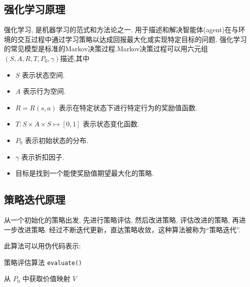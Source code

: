 \subsection{强化学习原理}

强化学习, 是机器学习的范式和方法论之一. 
用于描述和解决智能体(agent)在与环境的交互过程中通过学习策略以达成回报最大化或实现特定目标的问题.
强化学习的常见模型是标准的Markov决策过程.Markov决策过程可以用六元组\((S,A,R,T,P_0,\gamma)\)描述,其中
\begin{itemize}
    \item \(S\) 表示状态空间.
    \item \(A\) 表示行为空间.
    \item \(R = R(s, a)\) 表示在特定状态下进行特定行为的奖励值函数.
    \item \(T: S \times A \times S \mapsto [0,1]\) 表示状态变化函数.
    \item \(P_0\) 表示初始状态的分布.
    \item \(\gamma\) 表示折扣因子.
    \item 目标是找到一个能使奖励值期望最大化的策略.
\end{itemize}

\subsection{策略迭代原理}

从一个初始化的策略出发, 先进行策略评估, 然后改进策略,
评估改进的策略, 再进一步改进策略.
经过不断迭代更新，直达策略收敛，这种算法被称为``策略迭代''.

此算法可以用伪代码表示:

\begin{algorithm}[H]
    \caption{策略评估算法 \texttt{evaluate()}}
    
    从 \(P_0\) 中获取价值映射 \(V\) \\
\end{algorithm}   

